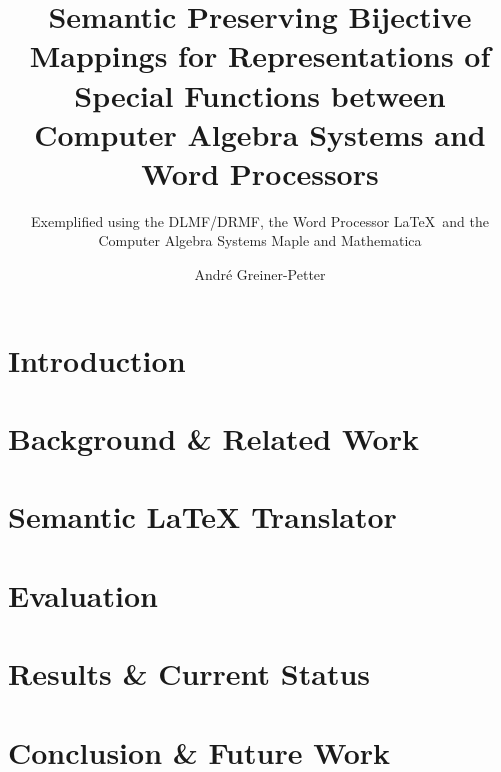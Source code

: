 \documentclass[a4paper,11pt,twoside]{report}
\title{
    Semantic Preserving Bijective Mappings for Representations of Special Functions between Computer Algebra Systems and Word Processors
}
\subtitle{
    Exemplified using the DLMF/DRMF, the Word Processor \LaTeX\ and the Computer Algebra Systems Maple and Mathematica
}
\author{Andr\'e Greiner-Petter}
\begin{document}




\tableofcontents
\newpage

\setcounter{page}{1}
\pagestyle{fancy}
\glsresetall

\chapter{Introduction}


\chapter{Background \& Related Work}\label{ch:background}









\cleardoublepage

\chapter{Semantic \LaTeX{} Translator}\label{ch:translator}




\chapter{Evaluation}\label{ch:evaluation}


\chapter{Results \& Current Status}\label{ch:results}


\chapter{Conclusion \& Future Work}\label{ch:conc-future-work}


\end{document}
